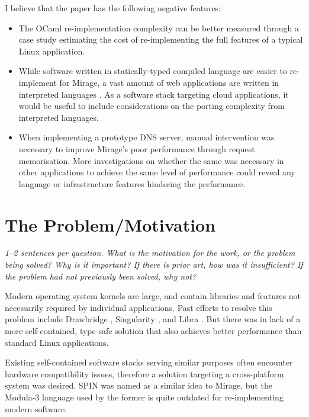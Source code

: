 \documentclass[11pt]{article}
\begin{document}
I believe that the paper has the following negative features:
\begin{itemize}
	\item The OCaml re-implementation complexity can be better measured through a case study estimating the cost of re-implementing the full features of a typical Linux application.
	\item While software written in statically-typed compiled language are easier to re-implement for Mirage, a vast amount of web applications are written in interpreted languages \cite{prokhorenko2016web}. As a software stack targeting cloud applications, it would be useful to include considerations on the porting complexity from interpreted languages.
	\item When implementing a prototype DNS server, manual intervention was necessary to improve Mirage's poor performance through request memorisation. More investigations on whether the same was necessary in other applications to achieve the same level of performance could reveal any language or infrastructure features hindering the performance.
\end{itemize}

\section*{The Problem/Motivation}
\textsl{1--2 sentences per question. What is the motivation for the work, or the problem being solved? Why is it important? If there is prior art, how was it insufficient? If the problem had not previously been solved, why not?}

Modern operating system kernels are large, and contain libraries and features not necessarily required by individual applications. Past efforts to resolve this problem include Drawbridge \cite{porter2011rethinking}, Singularity \cite{hunt2007singularity}, and Libra \cite{ammons2007libra}. But there was in lack of a more self-contained, type-safe solution that also achieves better performance than standard Linux applications. 

Existing self-contained software stacks \cite{engler1995exokernel} \cite{leslie1996design} serving similar purposes often encounter hardware compatibility issues, therefore a solution targeting a cross-platform system was desired. SPIN \cite{bershad1995extensibility} was named as a similar idea to Mirage, but the Modula-3 language used by the former is quite outdated for re-implementing modern software.
\end{document}

